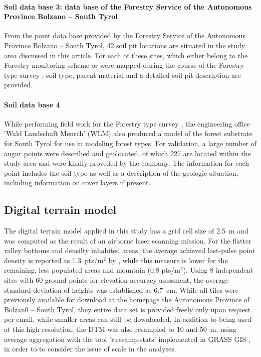\documentclass[preprint,12pt,authoryear]{elsarticle}
\begin{document}
\paragraph{Soil data base 3: data base of the Forestry Service of the Autonomous Province Bolzano -- South Tyrol} 
From the point data base provided by the Forestry Service of the Autonomous
Province Bolzano -- South Tyrol, 42 soil pit locations  are situated in the study area discussed in this article. For each of these sites, which either belong to the Forestry monitoring scheme or were mapped during the course of the Forestry type survey \citep{APB2006}, soil type, parent material and a detailed soil pit description are provided.

\paragraph{Soil data base 4} 
While performing field work for the Forestry type survey \citep{APB2006}, the engineering office 'Wald Landschaft Mensch' (WLM) also produced a model of the forest substrate for South Tyrol for use in modeling forest types. For validation, a large number of augur points were described and geolocated, of which 227 are located within the study area and were kindly proveded by the company. The information for each point includes the soil type as well as a description of the geologic situation, including information on cover layers if present.


\subsection{Digital terrain model}
The digital terrain model applied in this study has a grid cell size of 2.5~m and was computed as the result of an airborne laser scanning mission. For the flatter valley bottoms and densilty inhabited areas, the average achieved last-pulse point density is reported as 1.3~pts/m$^2$ by \cite{Wack2005}, while this measure is lower for the remaining, less populated areas and mountain (0.8 pts/m$^2$). Using 8 independent sites with 60 ground points for elevation accuracy asessment, the average standard deviation of heights was established as 6.7~cm. While all tiles were previously available for download at the homepage the Autonomous Province of Bolzan0 --  South Tyrol, they entire data set is provided freely only upon request per email, while smaller areas can still be downloaded. In addition to being used at this high resolution,  the DTM was also resampled to 10 and 50~m, using average aggregation with the tool 'r.resamp.stats' implemented in GRASS GIS \citep{GRASS}, in order to to consider the issue of scale in the analyses.
\end{document}
